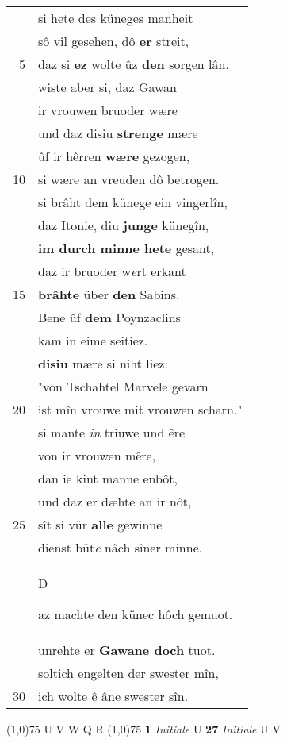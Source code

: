 \documentclass[8pt,a4paper,notitlepage]{article}
\begin{document}
\begin{table}[ht]
\begin{minipage}[t]{0.5\linewidth}
\begin{tabular}{rl}
 & si hete des küneges manheit\\ 
 & sô vil gesehen, dô \textbf{er} streit,\\ 
5 & daz si \textbf{ez} wolte ûz \textbf{den} sorgen lân.\\ 
 & wiste aber si, daz Gawan\\ 
 & ir vrouwen bruoder wære\\ 
 & und daz disiu \textbf{strenge} mære\\ 
 & ûf ir hêrren \textbf{wære} gezogen,\\ 
10 & si wære an vreuden dô betrogen.\\ 
 & si brâht dem künege ein vingerlîn,\\ 
 & daz Itonie, diu \textbf{junge} künegîn,\\ 
 & \textbf{im durch minne hete} gesant,\\ 
 & daz ir bruoder w\textit{e}rt erkant\\ 
15 & \textbf{brâhte} über \textbf{den} Sabins.\\ 
 & Bene ûf \textbf{dem} Poynzaclins\\ 
 & kam in eime seitiez.\\ 
 & \textbf{disiu} mære si niht liez:\\ 
 & "von Tschahtel Marvele gevarn\\ 
20 & ist mîn vrouwe mit vrouwen scharn."\\ 
 & si mante \textit{in} triuwe und êre\\ 
 & von ir vrouwen mêre,\\ 
 & dan ie kint manne enbôt,\\ 
 & und daz er dæhte an ir nôt,\\ 
25 & sît si vür \textbf{alle} gewinne\\ 
 & dienst büt\textit{e} nâch sîner minne.\\ 
 & \begin{large}D\end{large}az machte den künec hôch gemuot.\\ 
 & unrehte er \textbf{Gawane doch} tuot.\\ 
 & soltich engelten der swester mîn,\\ 
30 & ich wolte ê âne swester sîn.\\ 
\end{tabular}
\scriptsize
\line(1,0){75} \newline
U V W Q R \newline
\line(1,0){75} \newline
\textbf{1} \textit{Initiale} U  \textbf{27} \textit{Initiale} U V  \newline

\end{minipage}
\end{table}
\end{document}
